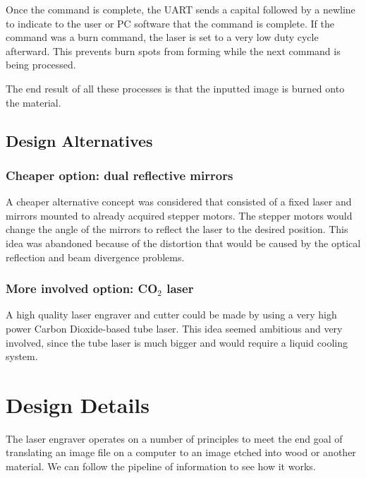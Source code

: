 \documentclass[11pt]{LaTeX-Classes/math-hw}
\begin{document}
Once the command is complete, the UART sends a capital  followed by a newline
to indicate to the user or PC software that the command is complete.
If the command was a burn command, the laser is set to a very low duty cycle afterward. This prevents
burn spots from forming while the next command is being processed.

The end result of all these processes is that the inputted image is burned onto the material.

\subsection{Design Alternatives}
\subsubsection{Cheaper option: dual reflective mirrors}
A cheaper alternative concept was considered that consisted of a fixed laser and
mirrors mounted to already acquired stepper motors. The stepper motors would change the angle of the mirrors to reflect
the laser to the desired position. This idea was abandoned because of the distortion
that would be caused by the optical reflection and beam divergence problems.

\subsubsection{More involved option: CO$_2$ laser}
A high quality laser engraver and cutter could be made by using a very high power Carbon Dioxide-based
tube laser. This idea seemed ambitious and very involved, since the tube laser is much bigger
and would require a liquid cooling system.

\section{Design Details}
The laser engraver operates on a number of principles to meet the end goal of
translating an image file on a computer to an image etched into wood or another material.
We can follow the pipeline of information to see how it works.
\end{document}
